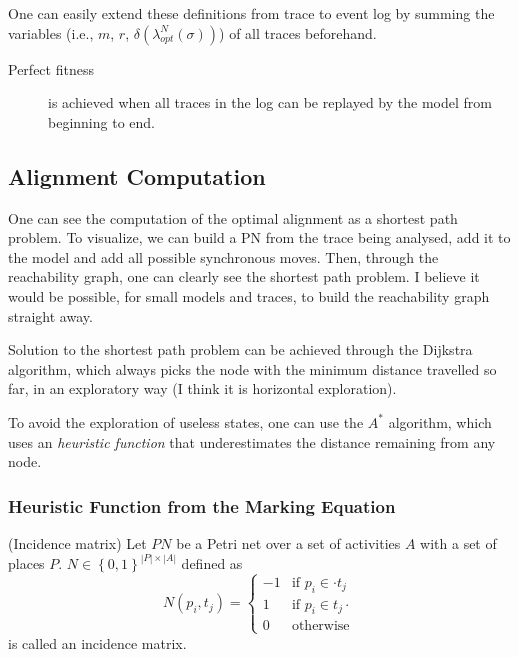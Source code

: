 \documentclass[a4paper]{report}
\begin{document}
\begin{note}
    One can easily extend these definitions from trace to event log by summing the variables (i.e., $m$, $r$, $\delta \left( \lambda^{N}_{opt}(\sigma) \right)$) of all traces beforehand.
\end{note}

\begin{description}
    \item[Perfect fitness] is achieved when all traces in the log can be replayed by the model from beginning to end.
\end{description}

\subsection*{Alignment Computation}

One can see the computation of the optimal alignment as a shortest path problem. To visualize, we can build a PN from the trace being analysed, add it to the model and add all possible synchronous moves. Then, through the reachability graph, one can clearly see the shortest path problem. I believe it would be possible, for small models and traces, to build the reachability graph straight away.

Solution to the shortest path problem can be achieved through the Dijkstra algorithm, which always picks the node with the minimum distance travelled so far, in an exploratory way (I think it is horizontal exploration).

To avoid the exploration of useless states, one can use the $A^{*}$ algorithm, which uses an \emph{heuristic function} that underestimates the distance remaining from any node.

\subsubsection*{Heuristic Function from the Marking Equation}

\begin{definition}
    (Incidence matrix) Let $PN$ be a Petri net over a set of activities $A$ with a set of places $P$. $N\in \left\{ 0,1 \right\} ^{|P|\times |A|}$ defined as \[
	N(p_i, t_j) = 
	\begin{cases}
	    -1 & \text{if } p_i \in \cdot t_j \\
	    1 & \text{if } p_i \in t_j\cdot  \\
	    0 & \text{otherwise}
	\end{cases}
    \] is called an incidence matrix.
\end{definition}
\end{document}
